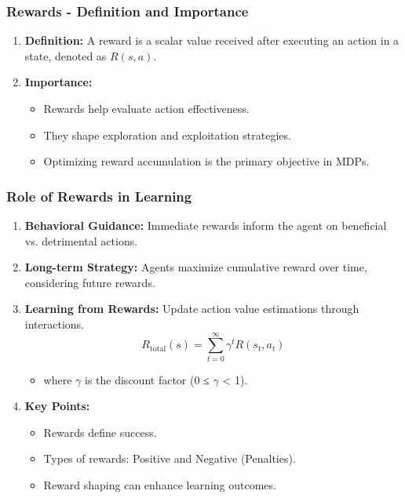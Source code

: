 \documentclass[aspectratio=169]{beamer}
\begin{document}
\begin{frame}[fragile]
    \frametitle{Rewards - Definition and Importance}
    \begin{enumerate}
        \item \textbf{Definition:} A reward is a scalar value received after executing an action in a state, denoted as \( R(s, a) \).
        
        \item \textbf{Importance:}
        \begin{itemize}
            \item Rewards help evaluate action effectiveness.
            \item They shape exploration and exploitation strategies.
            \item Optimizing reward accumulation is the primary objective in MDPs.
        \end{itemize}
    \end{enumerate}
\end{frame}

\begin{frame}[fragile]
    \frametitle{Role of Rewards in Learning}
    \begin{enumerate}
        \item \textbf{Behavioral Guidance:} Immediate rewards inform the agent on beneficial vs. detrimental actions.
        \item \textbf{Long-term Strategy:} Agents maximize cumulative reward over time, considering future rewards.
        \item \textbf{Learning from Rewards:} Update action value estimations through interactions.
        \begin{equation}
            R_{\text{total}}(s) = \sum_{t=0}^{\infty} \gamma^t R(s_t, a_t)
        \end{equation}
        \begin{itemize}
            \item where \( \gamma \) is the discount factor (0 ≤ \( \gamma \) < 1).
        \end{itemize}
        \item \textbf{Key Points:}
        \begin{itemize}
            \item Rewards define success.
            \item Types of rewards: Positive and Negative (Penalties).
            \item Reward shaping can enhance learning outcomes.
        \end{itemize}
    \end{enumerate}
\end{frame}
\end{document}
